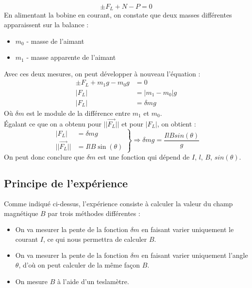 \documentclass[12pt,a4paper]{article}
\begin{document}
    \begin{equation*}
        \pm F_L + N - P = 0
    \end{equation*}
    En alimentant la bobine en courant, on constate que deux masses différentes apparaissent sur la balance :
    \begin{itemize}
        \item $m_0$ - masse de l'aimant
        \item $m_1$ - masse apparente de l'aimant
    \end{itemize}
    Avec ces deux mesures, on peut développer à nouveau l'équation :
    \begin{align*}
        \pm F_L + m_1g - m_0g &= 0 \\
        |F_L| &= |m_1 - m_0|g \\
        |F_L| &= \delta m g
    \end{align*}
    Où $\delta m$ est le module de la différence entre $m_1$ et $m_0$. \\
    Égalant ce que on a obtenu pour $||\vec{F_L}||$ et pour $|F_L|$, on obtient :
    \begin{equation*}
        \left.
        \begin{aligned}
            |F_L| &= \delta mg \\
            ||\vec{F_L}|| &= IlB\sin(\theta)
        \end{aligned}
        \right\}
        \Rightarrow
        \delta mg = \frac{IlBsin(\theta)}{g}
    \end{equation*}
    On peut donc conclure que $\delta m$ est une fonction qui dépend de $I$, $l$, $B$, $sin(\theta)$.

    \subsection{Principe de l'expérience}
    \sloppy
    Comme indiqué ci-dessus, l'expérience consiste à calculer la valeur du champ magnétique $B$ par trois méthodes différentes :
    \begin{itemize}
        \item On va mesurer la pente de la fonction $\delta m$ en faisant varier uniquement le courant $I$, ce qui nous permettra de calculer $B$.
        \item On va mesurer la pente de la fonction $\delta m$ en faisant varier uniquement l'angle $\theta$, d'où on peut calculer de la même façon $B$.
        \item On mesure $B$ à l'aide d'un teslamètre.
    \end{itemize}
\end{document}
